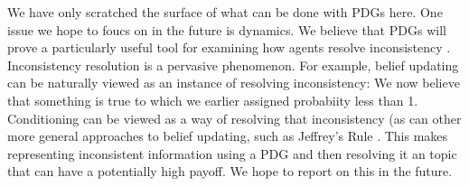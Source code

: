 \documentclass{article}
\theoremstyle{plain}
\theoremstyle{definition}
\theoremstyle{remark}
\newcommand{\todo}[1]{{\color{red}\ \!\Large\smash{\textbf{[}}{\normalsize\textsc{todo:} #1}\ \!\smash{\textbf{]}}}}
\numberwithin{equation}{section}
\begin{document}
We have only scratched the surface of what can be done with PDGs here.
%
One issue we hope to foucs on in the future is dynamics.  We believe
that PDGs will prove a particularly useful tool for examining how agents resolve
inconsistency%
.
Inconsistency resolution is a pervasive phenomenon.
For example, belief updating can be naturally viewed as an instance of
resolving inconsistency: We now believe that something is true to
which we earlier assigned probabiity less than 1.  Conditioning can be
viewed as a way of resolving that inconsistency (as can other more
general approaches to belief updating, such as Jeffrey's Rule
\cite{Jeffrey68}. 
%
This makes representing inconsistent information using a PDG and then
resolving it an topic that can have a potentially high payoff.
We hope to report on this in the future.

	
\end{document}
